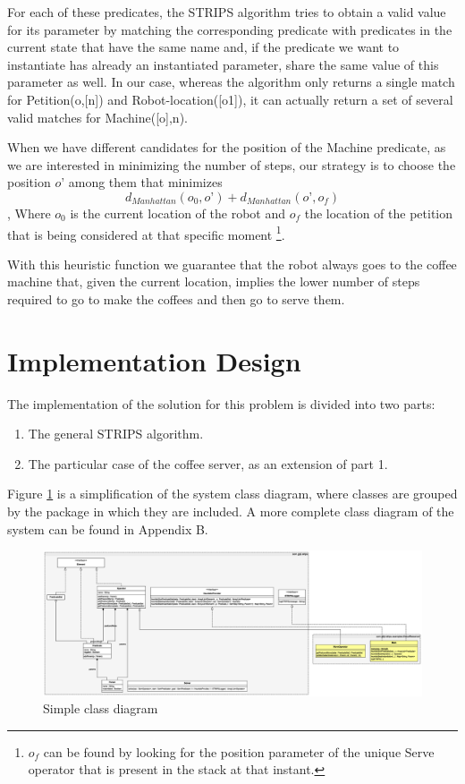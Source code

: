 \documentclass[12pt,a4paper,oneside]{article}
\numberwithin{equation}{section}
\numberwithin{equation}{section}
\theoremstyle{definition}
\begin{document}
For each of these predicates, the STRIPS algorithm tries to obtain a valid value for its parameter by matching the corresponding predicate with predicates in the current state that have the same name and, if the predicate we want to instantiate has already an instantiated parameter, share the same value of this parameter as well. In our case, whereas the algorithm only returns a single match for  Petition(o,[n]) and Robot-location([o1]), it can actually return a set of several valid matches for Machine([o],n). 


When we have different candidates for the position of the Machine predicate, as we are interested in minimizing the number of steps, our strategy is to choose the position $o’$ among them that minimizes
$$d_{Manhattan} (o_0, o’) + d_{Manhattan}(o’, o_f)$$,
Where $o_0$ is the current location of the robot and $o_f$ the location of the petition that is being considered at that specific moment \footnote{$o_f$ can be found by looking for the position parameter of the unique Serve operator that is present in the stack at that instant.}. 


With this heuristic function we guarantee that the robot always goes to the coffee machine that, given the current location, implies the lower number of steps required to go to make the coffees and then go to serve them.


\section{Implementation Design} \label{Implementation Design}
The implementation of the solution for this problem is divided into two parts:
\begin{enumerate}
	\item The general STRIPS algorithm.
	\item The particular case of the coffee server, as an extension of part 1.
\end{enumerate}
Figure \ref{simplediagram} is a simplification of the system class diagram, where classes are grouped by the package in which they are included. A more complete class diagram of the system can be found in Appendix B.

\begin{figure}[h!]
	\begin{center}
	\includegraphics[scale=0.22]{simple}
	\end{center}
	\caption{Simple class diagram}
	\label{simplediagram}
\end{figure}
\end{document}
